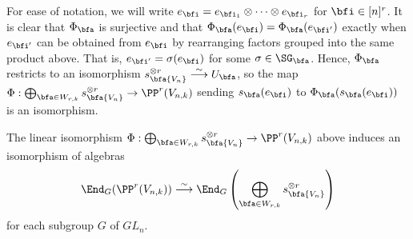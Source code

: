 For ease of notation, we will write $e_\bfi=e_{\bfi_1}\otimes\dots\otimes e_{\bfi_r}$ for $\bfi\in[n]^r$. It is clear that $\Phi_\bfa$ is surjective and that $\Phi_\bfa(e_\bfi)=\Phi_\bfa(e_{\bfi'})$ exactly when $e_{\bfi'}$ can be obtained from $e_\bfi$ by rearranging factors grouped into the same product above. That is, $e_{\bfi'}=\sigma(e_\bfi)$ for some $\sigma\in\SG_\bfa$. Hence, $\Phi_\bfa$ restricts to an isomorphism $s_\bfa{V_n}^{\otimes r}\stackrel{\sim}{\longrightarrow} U_\bfa$, so the map $\Phi:\bigoplus_{\bfa\in W_{r,k}}s_\bfa {V_n}^{\otimes r}\to \PP^r(V_{n,k})$ sending $s_\bfa(e_\bfi)$ to $\Phi_\bfa(s_\bfa(e_\bfi))$ is an isomorphism.

\begin{lemma}\label{lem:induced_isomorphism}
    The linear isomorphism $\Phi: \bigoplus_{\bfa\in W_{r,k}} s_\bfa{V_n}^{\otimes r}\to\PP^r(V_{n,k})$ above induces an isomorphism of algebras \[\End_G(\PP^r(V_{n,k}))\stackrel{\sim}{\longrightarrow}\End_G\left(\bigoplus_{\bfa\in W_{r,k}}s_\bfa{V_n}^{\otimes r}\right)\] for each subgroup $G$ of $GL_n$.
\end{lemma}

